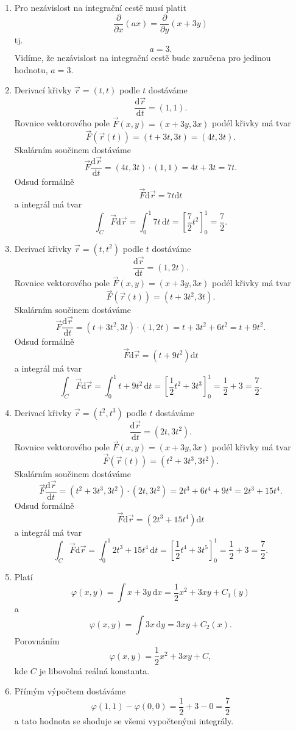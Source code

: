 \documentclass{article}
\begin{document}
\begin{enumerate}[1)]
\item
  Pro nezávislost na integrační cestě musí platit $$\frac{\partial}{\partial x}(ax)=\frac{\partial}{\partial y}(x+3y)$$
  tj. $$a=3.$$ Vidíme, že nezávislost na integrační cestě bude zaručena pro jedinou hodnotu, $a=3$.
\item Derivací křivky $\vec r=(t,t)$ podle $t$ dostáváme
$$\frac{\mathrm d\vec r}{\mathrm dt}=(1,1).$$
Rovnice vektorového pole $\vec F(x,y)=(x+3y,3x)$ podél křivky má tvar
$$\vec F(\vec r(t))=(t+3t,3t)=(4t,3t).$$
Skalárním součinem dostáváme
$$\vec F \frac{\mathrm d\vec r}{\mathrm dt}=
(4t,3t)\cdot (1,1) = 4t+3t =7t.
$$
Odsud formálně $$\vec F\mathrm d\vec r=7t\mathrm dt$$
a integrál má tvar
$$\int_C\vec F\mathrm d\vec r=\int_0^{1}7t\,\mathrm dt=\left [\frac 72 t^2\right]_0^1=\frac 7 2.$$

\item Derivací křivky $\vec r=(t,t^2)$ podle $t$ dostáváme
$$\frac{\mathrm d\vec r}{\mathrm dt}=(1,2t).$$
Rovnice vektorového pole $\vec F(x,y)=(x+3y,3x)$ podél křivky má tvar
$$\vec F(\vec r(t))=(t+3t^2,3t).$$
Skalárním součinem dostáváme
$$\vec F \frac{\mathrm d\vec r}{\mathrm dt}=
(t+3t^2,3t)\cdot (1,2t) = t+3t^2+6t^2 =t+9t^2.
$$
Odsud formálně $$\vec F\mathrm d\vec r=(t+9t^2)\mathrm dt$$
a integrál má tvar
$$\int_C\vec F\mathrm d\vec r=\int_0^{1}t+9t^2 \,\mathrm dt=\left [\frac 12 t^2+3t^3\right]_0^1=\frac 12 +3=\frac 7 2.$$


\item Derivací křivky $\vec r=(t^2,t^3)$ podle $t$ dostáváme
$$\frac{\mathrm d\vec r}{\mathrm dt}=(2t,3t^2).$$
Rovnice vektorového pole $\vec F(x,y)=(x+3y,3x)$ podél křivky má tvar
$$\vec F(\vec r(t))=(t^2+3t^3,3t^2).$$
Skalárním součinem dostáváme
$$\vec F \frac{\mathrm d\vec r}{\mathrm dt}=
(t^2+3t^3,3t^2)\cdot (2t,3t^2) = 2t^3+6t^4+9t^4 =2t^3+15t^4.
$$
Odsud formálně $$\vec F\mathrm d\vec r=(2t^3+15t^4)\mathrm dt$$
a integrál má tvar
$$\int_C\vec F\mathrm d\vec r=\int_0^{1}2t^3+15t^4 \,\mathrm dt=\left [\frac 12 t^4+3t^5\right]_0^1=\frac 12 +3=\frac 7 2.$$

\item Platí
  $$\varphi (x,y)=\int x+3y\,\mathrm dx=\frac 12 x^2+3xy+C_1(y)$$
  a
  $$\varphi (x,y)=\int 3x\,\mathrm dy=3xy+C_2(x).$$
  Porovnáním
  $$\varphi (x,y)=\frac 12 x^2+3xy+C,$$
  kde $C$ je libovolná reálná konstanta.
\item Přímým výpočtem dostáváme
  $$\varphi(1,1)-\varphi(0,0)=\frac 12 + 3 - 0 =\frac 72$$
  a tato hodnota se shoduje se všemi vypočtenými integrály.

\end{enumerate}
\end{document}
